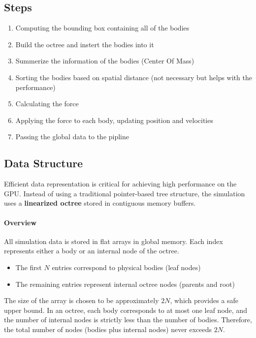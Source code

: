\documentclass[12pt]{article}
\begin{document}
\subsection{Steps}
\begin{enumerate}
    \item Computing the bounding box containing all of the bodies
    \item Build the octree and instert the bodies into it
    \item Summerize the information of the bodies (Center Of Mass)
    \item Sorting the bodies based on spatial distance (not necessary but helps with the performance)
    \item Calculating the force
    \item Applying the force to each body, updating position and velocities
    \item Passing the global data to the pipline
\end{enumerate}

\subsection{Data Structure}

Efficient data representation is critical for achieving high performance on the GPU.
Instead of using a traditional pointer-based tree structure, the simulation uses a
\textbf{linearized octree} stored in contiguous memory buffers.

\paragraph{Overview}

All simulation data is stored in flat arrays in global memory.
Each index represents either a body or an internal node of the octree.

\begin{itemize}
    \item The first $N$ entries correspond to physical bodies (leaf nodes)
    \item The remaining entries represent internal octree nodes (parents and root)
\end{itemize}
The size of the array is chosen to be approximately $2N$, which provides a safe upper bound.
In an octree, each body corresponds to at most one leaf node, and the number of internal nodes
is strictly less than the number of bodies. Therefore, the total number of nodes
(bodies plus internal nodes) never exceeds $2N$.  
\end{document}
